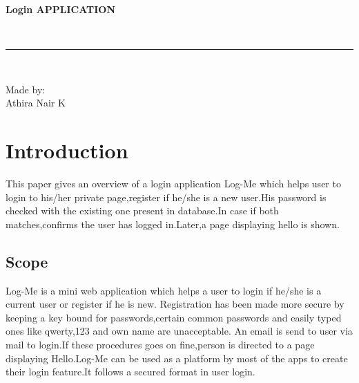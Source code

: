 \documentclass[11pt, english]{article}
\begin{document}
\begin{titlepage}

\begin{center}
\vspace*{-1in}
\begin{figure}[htb]
\begin{center}

\end{center}
\end{figure}

\begin{large}
\textbf{Login APPLICATION}\\
\end{large}
\vspace*{0.2in}
\begin{Large}

\end{Large}
\vspace*{0.3in}
\begin{large}
\\
\end{large}
\vspace*{0.3in}
\rule{80mm}{0.1mm}\\
\vspace*{0.1in}
\begin{large}
Made by: \\
Athira Nair K\\
\end{large}

\end{center}
\end{titlepage}

\newcommand{\CC}{C\nolinebreak\hspace{-.05em}\raisebox{.4ex}{\tiny\bf +}\nolinebreak\hspace{-.10em}\raisebox{.4ex}{\tiny\bf +}}
\def\CC{{C\nolinebreak[4]\hspace{-.05em}\raisebox{.4ex}{\tiny\bf ++}}}

\tableofcontents
\newpage
\section{Introduction}
This paper gives an overview of a login application Log-Me which helps user to login to his/her private page,register if he/she is a new user.His password is checked with the existing one present in database.In case if both matches,confirms the user has logged in.Later,a page displaying hello is shown.

\subsection{Scope}
Log-Me is a mini web application which helps a user to login if he/she is a current user or register if he is new. Registration has been made more secure by keeping a key bound for passwords,certain common passwords and easily typed ones like qwerty,123 and own name are unacceptable. An email is send to user via mail to login.If these procedures goes on fine,person is directed to a page displaying Hello.Log-Me can be used as a platform by most of the apps to create their login feature.It follows a secured format in user login.
\end{document}
